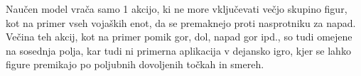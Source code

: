\documentclass[a4paper, 12pt]{book}
\begin{document}
Naučen model vrača samo 1 akcijo, ki ne more vključevati večjo skupino figur, kot na primer vseh vojaških enot, da se premaknejo proti nasprotniku za napad.
Večina teh akcij, kot na primer pomik gor, dol, napad gor ipd., so tudi omejene na sosednja polja, kar tudi ni primerna aplikacija v dejansko igro, kjer se lahko figure premikajo po poljubnih dovoljenih točkah in smereh.

\end{document}
